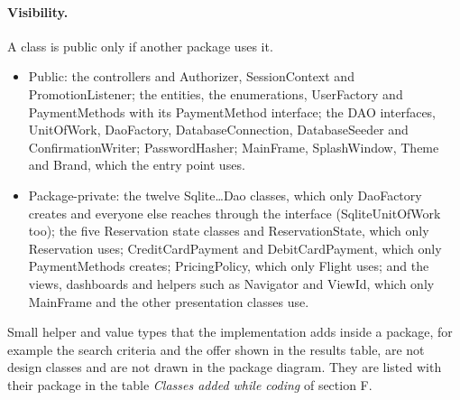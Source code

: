 \paragraph{Visibility.} A class is public only if another package uses it.
\begin{itemize}
\item Public: the controllers and Authorizer, SessionContext
  and PromotionListener; the entities, the enumerations, UserFactory
  and PaymentMethods with its PaymentMethod interface;
  the DAO interfaces, UnitOfWork, DaoFactory, DatabaseConnection,
  DatabaseSeeder and ConfirmationWriter; PasswordHasher;
  MainFrame, SplashWindow, Theme and Brand, which the entry point uses.
\item Package-private: the twelve Sqlite\dots Dao classes, which only
  DaoFactory creates and everyone else reaches through the interface (SqliteUnitOfWork too);
  the five Reservation state classes and ReservationState, which only
  Reservation uses; CreditCardPayment and DebitCardPayment,
  which only PaymentMethods creates; PricingPolicy, which only Flight uses; and the
  views, dashboards and helpers such as Navigator and ViewId, which only MainFrame and the
  other presentation classes use.
\end{itemize}

Small helper and value types that the implementation adds inside a package, for
example the search criteria and the offer shown in the results table, are not
design classes and are not drawn in the package diagram. They are listed with
their package in the table \emph{Classes added while coding} of section F.

